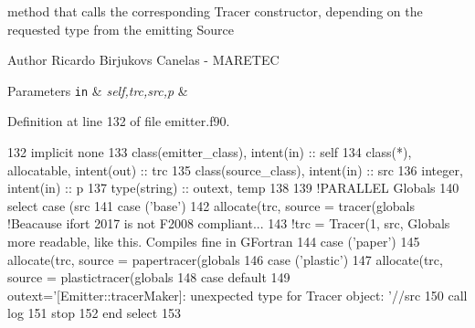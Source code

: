 method that calls the corresponding Tracer constructor, depending on the requested type from the emitting Source 

\begin{DoxyAuthor}{Author}
Ricardo Birjukovs Canelas -\/ M\+A\+R\+E\+T\+EC 
\end{DoxyAuthor}

\begin{DoxyParams}[1]{Parameters}
\mbox{\tt in}  & {\em self,trc,src,p} & \\
\hline
\end{DoxyParams}


Definition at line 132 of file emitter.\+f90.


\begin{DoxyCode}
132     \textcolor{keywordtype}{implicit none}
133     \textcolor{keywordtype}{class}(emitter\_class), \textcolor{keywordtype}{intent(in)} :: self
134     \textcolor{keywordtype}{class}(*), \textcolor{keywordtype}{allocatable}, \textcolor{keywordtype}{intent(out)} :: trc
135     \textcolor{keywordtype}{class}(source\_class), \textcolor{keywordtype}{intent(in)} :: src
136     \textcolor{keywordtype}{integer}, \textcolor{keywordtype}{intent(in)} :: p
137     \textcolor{keywordtype}{type}(string) :: outext, temp
138 
139     \textcolor{comment}{!PARALLEL Globals%
140     \textcolor{keywordflow}{select case} (src%
141     \textcolor{keywordflow}{case} (\textcolor{stringliteral}{'base'})
142         \textcolor{keyword}{allocate}(trc, source = tracer(globals%
      !Beacause ifort 2017 is not F2008 compliant...}
143         \textcolor{comment}{!trc = Tracer(1, src, Globals%
       more readable, like this. Compiles fine in GFortran}
144     \textcolor{keywordflow}{case} (\textcolor{stringliteral}{'paper'})
145         \textcolor{keyword}{allocate}(trc, source = papertracer(globals%
146     \textcolor{keywordflow}{case} (\textcolor{stringliteral}{'plastic'})
147         \textcolor{keyword}{allocate}(trc, source = plastictracer(globals%
148 \textcolor{keywordflow}{        case default}
149         outext=\textcolor{stringliteral}{'[Emitter::tracerMaker]: unexpected type for Tracer object: '}//src%
150         \textcolor{keyword}{call }log%
151         stop
152 \textcolor{keywordflow}{    end select}
153 
\end{DoxyCode}
